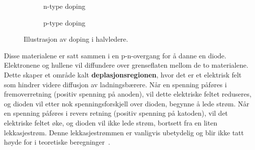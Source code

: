 \begin{figure}[H]
\centering

\begin{subfigure}{0.45\textwidth}
\centering
{}
\caption{n-type doping}
\end{subfigure}
\hfill
\begin{subfigure}{0.45\textwidth}
\centering
{}
\caption{p-type doping}
\end{subfigure}

\caption{Illustrasjon av doping i halvledere.}
\end{figure}

\noindent
Disse materialene er satt sammen i en p-n-overgang for å danne en diode. Elektronene og hullene vil diffundere over grenseflaten mellom de to materialene. Dette skaper et område kalt \textbf{deplasjonsregionen}, hvor det er et elektrisk felt som hindrer videre diffusjon av ladningsbærere. Når en spenning påføres i fremoverretning (positiv spenning på anoden), vil dette elektriske feltet reduseres, og dioden vil etter nok spenningsforskjell over dioden, begynne å lede strøm. Når en spenning påføres i revers retning (positiv spenning på katoden), vil det elektriske feltet øke, og dioden vil ikke lede strøm, bortsett fra en liten lekkasjestrøm. Denne lekkasjestrømmen er vanligvis ubetydelig og blir ikke tatt høyde for i teoretiske beregninger~\cite{learningBook}.

